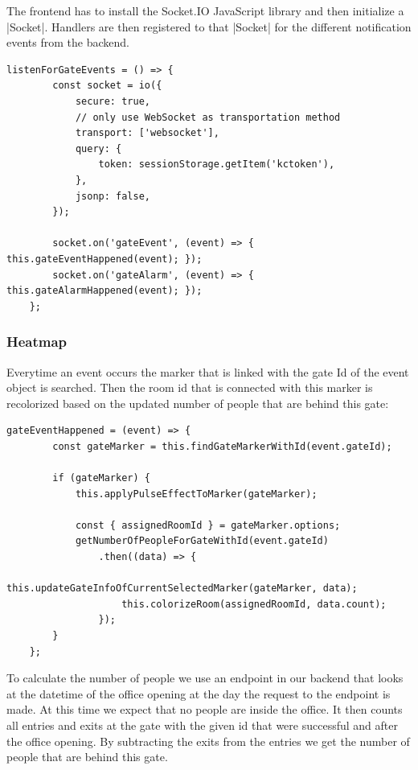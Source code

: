 The frontend has to install the Socket.IO JavaScript library and then initialize a |Socket|\cite{socketio:socket}. Handlers are then registered to that |Socket| for the different notification events from the backend.

\begin{lstlisting}[label=socketIOClientSide]
listenForGateEvents = () => {
        const socket = io({
            secure: true,
            // only use WebSocket as transportation method
            transport: ['websocket'],
            query: {
                token: sessionStorage.getItem('kctoken'),
            },
            jsonp: false,
        });

        socket.on('gateEvent', (event) => { this.gateEventHappened(event); });
        socket.on('gateAlarm', (event) => { this.gateAlarmHappened(event); });
    };
\end{lstlisting}


\subsubsection{Heatmap}

Everytime an event occurs the marker that is linked with the gate Id of the event object is searched. Then the room id that is connected with this marker is recolorized based on the updated number of people that are behind this gate:

\begin{lstlisting}[label=gateEventHappened]
gateEventHappened = (event) => {
        const gateMarker = this.findGateMarkerWithId(event.gateId);

        if (gateMarker) {
            this.applyPulseEffectToMarker(gateMarker);

            const { assignedRoomId } = gateMarker.options;
            getNumberOfPeopleForGateWithId(event.gateId)
                .then((data) => {
                    this.updateGateInfoOfCurrentSelectedMarker(gateMarker, data);
                    this.colorizeRoom(assignedRoomId, data.count);
                });
        }
    };
\end{lstlisting}

To calculate the number of people we use an endpoint in our backend that looks at the datetime of the office opening at the day the request to the endpoint is made. At this time we expect that no people are inside the office. It then counts all entries and exits at the gate with the given id that were successful and after the office opening. By subtracting the exits from the entries we get the number of people that are behind this gate.


